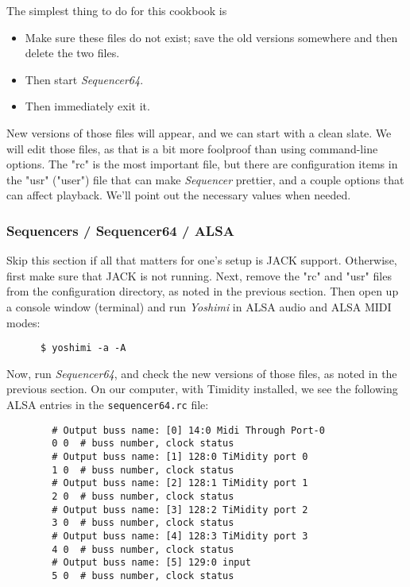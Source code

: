 
   The simplest thing to do for this cookbook is
   
   \begin{itemize}
      \item Make sure these files do not exist; save the old versions somewhere
      and then delete the two files.
      \item Then start \textsl{Sequencer64}.
      \item Then immediately exit it.
   \end{itemize}
      
   New versions of those files will appear, and we can start with a clean
   slate.  We will edit those files, as that is a bit more foolproof than using
   command-line options.  The "rc" is the most important file, but there are
   configuration items in the "usr" ("user") file that can make
   \textsl{Sequencer} prettier, and a couple options that can affect playback.
   We'll point out the necessary values when needed.

\subsubsection{Sequencers / Sequencer64 / ALSA}
\label{subsubsec:sequencers_seq64_alsa}

   Skip this section if all that matters for one's setup is JACK support.
   Otherwise, first make sure that JACK is not running.
   Next, remove the "rc" and "usr" files from the configuration directory, as
   noted in the previous section.
   Then open up a console window (terminal) and run \textsl{Yoshimi} in ALSA
   audio and ALSA MIDI modes:

   \begin{verbatim}
      $ yoshimi -a -A
   \end{verbatim}

   Now, run \textsl{Sequencer64}, and check the new
   versions of those files, as noted in the previous section.
   On our computer, with Timidity installed, we see the following ALSA entries
   in the \texttt{sequencer64.rc} file:

   \begin{verbatim}
		# Output buss name: [0] 14:0 Midi Through Port-0
		0 0  # buss number, clock status
		# Output buss name: [1] 128:0 TiMidity port 0
		1 0  # buss number, clock status
		# Output buss name: [2] 128:1 TiMidity port 1
		2 0  # buss number, clock status
		# Output buss name: [3] 128:2 TiMidity port 2
		3 0  # buss number, clock status
		# Output buss name: [4] 128:3 TiMidity port 3
		4 0  # buss number, clock status
		# Output buss name: [5] 129:0 input
		5 0  # buss number, clock status
   \end{verbatim}

